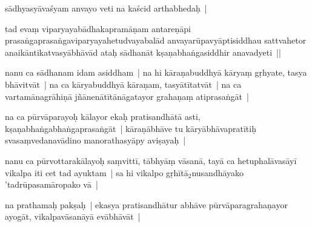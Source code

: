 \documentclass[article,12pt,a4paper]{memoir}%
\newcounter{parCount}
\begin{document}
	  \pstart \leavevmode%
	sādhyasyāvaśyam anvayo veti na kaścid arthabhedaḥ |
	{}
	\pend%
      

	  \pstart \leavevmode%
	\label{thakur75-70.26}tad evaṃ viparyayabādhakapramāṇam antareṇāpi prasaṅgaprasaṅgaviparyayahetudvayabalād anvayarūpavyāptisiddhau sattvahetor anaikāntikatvasyābhāvād ataḥ sādhanāt kṣaṇabhaṅgasiddhir anavadyeti ||
	{}
	\pend%
      

	  \pstart \leavevmode%
	\label{thakur75-71.1}nanu ca sādhanam idam asiddham | na hi kāraṇabuddhyā kāryaṃ gṛhyate, tasya bhāvitvāt | na ca kāryabuddhyā \leavevmode{} kāraṇam, tasyātītatvāt | na ca vartamānagrāhiṇā jñānenātītānāgatayor grahaṇaṃ atiprasaṅgāt |
	{}
	\pend%
      

	  \pstart \leavevmode%
	\label{thakur75-71.3}na ca pūrvāparayoḥ kālayor ekaḥ pratisandhātā asti, kṣaṇabhaṅgabhaṅgaprasaṅgāt | kāraṇābhāve tu kāryābhāvapratītiḥ svasaṃvedanavādino manorathasyāpy aviṣayaḥ |
	{}
	\pend%
      

	  \pstart \leavevmode%
	\label{thakur75-71.5}nanu ca pūrvottarakālayoḥ saṃvittī, tābhyāṃ vāsanā, tayā ca \label{ratnakīrtinibandhāvali__36r1PF7IMUVC4DF8QV4LEE5R9OG}hetu\label{ratnakīrtinibandhāvali__36r1PF7IMUU5ZOUZZQDXUR7YR87}phalāvasāyī vikalpa iti cet tad ayuktam | sa hi vikalpo gṛhītā{\tiny $_{2}$}nusandhāyako 'tadrūpasamāropako vā |
	{}
	\pend%
      

	  \pstart \leavevmode%
	\label{thakur75-71.7}na prathamaḥ pakṣaḥ | ekasya pratisandhātur abhāve pūrvāparagrahaṇayor ayogāt, vikalpavāsanāyā evābhāvāt |
	{}
	\pend%
      
\end{document}
